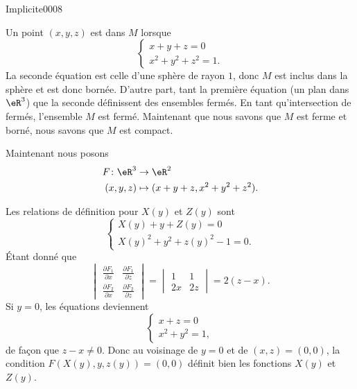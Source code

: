 
\begin{corrige}{Implicite0008}

	Un point $(x,y,z)$ est dans $M$ lorsque
	\begin{equation}
		\left\{
		\begin{array}{ll}
			x+y+z=0\\
			x^2+y^2+z^2=1.
		\end{array}
		\right.
	\end{equation}
	La seconde équation est celle d'une sphère de rayon $1$, donc $M$ est inclus dans la sphère et est donc bornée. D'autre part, tant la première équation (un plan dans $\eR^3$) que la seconde définissent des ensembles fermés. En tant qu'intersection de fermés, l'ensemble $M$ est fermé. Maintenant que nous savons que $M$ est ferme et borné, nous savons que $M$ est compact.

	Maintenant nous posons
	\begin{equation}
		\begin{aligned}
			F\colon \eR^3&\to \eR^2 \\
			(x,y,z)&\mapsto (x+y+z,x^2+y^2+z^2). 
		\end{aligned}
	\end{equation}

	Les relations de définition pour $X(y)$ et $Z(y)$ sont
	\begin{equation}			\label{EqHuitEqsqDefXZ}
		\left\{
		\begin{array}{ll}
			X(y)+y+Z(y)=0\\
			X(y)^2+y^2+z(y)^2-1=0.
		\end{array}
		\right.
	\end{equation}
	Étant donné que
	\begin{equation}
		\begin{vmatrix}
			\frac{ \partial F_1 }{ \partial x }	&	\frac{ \partial F_1 }{ \partial z }	\\ 
			\frac{ \partial F_2 }{ \partial x }	&	\frac{ \partial F_2 }{ \partial z }	
		\end{vmatrix}
		=
		\begin{vmatrix}
			1	&	1	\\ 
			2x	&	2z	
		\end{vmatrix}
		=
		2(z-x).
	\end{equation}
	Si $y=0$, les équations deviennent
	\begin{equation}
		\left\{
		\begin{array}{ll}
			x+z=0\\
			x^2+y^2=1,
		\end{array}
		\right.
	\end{equation}
	de façon que $z-x\neq 0$. Donc au voisinage de $y=0$ et de $(x,z)=(0,0)$, la condition $F(X(y),y,z(y))=(0,0)$ définit bien les fonctions $X(y)$ et $Z(y)$.


\end{corrige}
